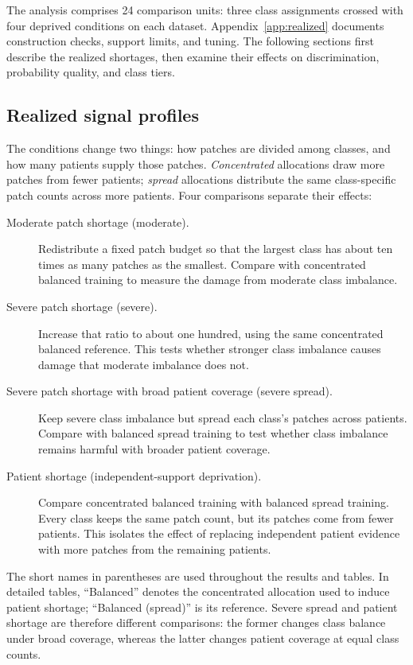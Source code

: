 \documentclass[11pt]{article}
\begin{document}
The analysis comprises \num{24} comparison units: three class assignments crossed with four deprived conditions on each dataset. Appendix~\ref{app:realized} documents construction checks, support limits, and tuning. The following sections first describe the realized shortages, then examine their effects on discrimination, probability quality, and class tiers.
\subsection{Realized signal profiles}
\label{sec:rq1-profiles}
The conditions change two things: how patches are divided among classes, and how many patients supply those patches. \emph{Concentrated} allocations draw more patches from fewer patients; \emph{spread} allocations distribute the same class-specific patch counts across more patients. Four comparisons separate their effects:
\begin{description}
  \item[Moderate patch shortage (moderate).] Redistribute a fixed patch budget so that the largest class has about ten times as many patches as the smallest. Compare with concentrated balanced training to measure the damage from moderate class imbalance.
  \item[Severe patch shortage (severe).] Increase that ratio to about one hundred, using the same concentrated balanced reference. This tests whether stronger class imbalance causes damage that moderate imbalance does not.
  \item[Severe patch shortage with broad patient coverage (severe spread).] Keep severe class imbalance but spread each class's patches across patients. Compare with balanced spread training to test whether class imbalance remains harmful with broader patient coverage.
  \item[Patient shortage (independent-support deprivation).] Compare concentrated balanced training with balanced spread training. Every class keeps the same patch count, but its patches come from fewer patients. This isolates the effect of replacing independent patient evidence with more patches from the remaining patients.
\end{description}
\noindent The short names in parentheses are used throughout the results and tables. In detailed tables, ``Balanced'' denotes the concentrated allocation used to induce patient shortage; ``Balanced (spread)'' is its reference. Severe spread and patient shortage are therefore different comparisons: the former changes class balance under broad coverage, whereas the latter changes patient coverage at equal class counts.
\end{document}
